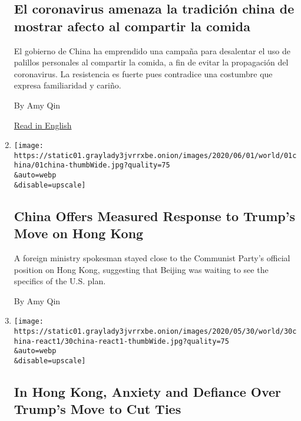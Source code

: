 \begin{enumerate}
  \hypertarget{el-coronavirus-amenaza-la-tradiciuxf3n-china-de-mostrar-afecto-al-compartir-la-comida}{%
  \subsection{El coronavirus amenaza la tradición china de mostrar
  afecto al compartir la
  comida}\label{el-coronavirus-amenaza-la-tradiciuxf3n-china-de-mostrar-afecto-al-compartir-la-comida}}

  El gobierno de China ha emprendido una campaña para desalentar el uso
  de palillos personales al compartir la comida, a fin de evitar la
  propagación del coronavirus. La resistencia es fuerte pues contradice
  una costumbre que expresa familiaridad y cariño.

  By Amy Qin

  \href{https://www.nytimes3xbfgragh.onion/2020/05/25/world/asia/china-coronavirus-chopsticks.html}{Read
  in English}
\item
  \href{/2020/06/01/world/asia/china-trump-hong-kong.html}{}

  \texttt{[image: https://static01.graylady3jvrrxbe.onion/images/2020/06/01/world/01china/01china-thumbWide.jpg?quality=75\\\&auto=webp\\\&disable=upscale]}

  \hypertarget{china-offers-measured-response-to-trumps-move-on-hong-kong}{%
  \subsection{China Offers Measured Response to Trump's Move on Hong
  Kong}\label{china-offers-measured-response-to-trumps-move-on-hong-kong}}

  A foreign ministry spokesman stayed close to the Communist Party's
  official position on Hong Kong, suggesting that Beijing was waiting to
  see the specifics of the U.S. plan.

  By Amy Qin
\item
  \href{/2020/05/30/world/asia/hong-kong-trump-china.html}{}

  \texttt{[image: https://static01.graylady3jvrrxbe.onion/images/2020/05/30/world/30china-react1/30china-react1-thumbWide.jpg?quality=75\\\&auto=webp\\\&disable=upscale]}

  \hypertarget{in-hong-kong-anxiety-and-defiance-over-trumps-move-to-cut-ties}{%
  \subsection{In Hong Kong, Anxiety and Defiance Over Trump's Move to
  Cut
  Ties}\label{in-hong-kong-anxiety-and-defiance-over-trumps-move-to-cut-ties}}


\end{enumerate}
